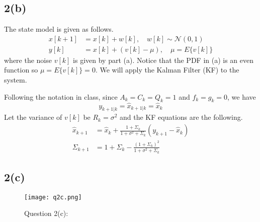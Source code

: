 \documentclass[a4paper, 11pt]{article}
\begin{document}
\subsection*{2(b)}

The state model is given as follows. 
\begin{equation}
\begin{split}
x[k+1] & = x[k] + w[k], \quad w[k]\sim\mathcal{N}(0,1)\\
y[k] & = x[k] + \left(v[k] - \mu \right), \quad \mu = E\{v[k]\}
\end{split}
\end{equation}
where the noise $v[k]$ is given by part (a). Notice that the PDF in (a) is an even function so $\mu =  E\{v[k]\} = 0$. We will apply the Kalman Filter (KF) to the system. 

Following the notation in class, since $A_k = C_k = Q_k = 1$ and $f_k = g_k = 0$, we have 
\begin{equation}
y_{k+1|k} = \hat{x}_{k+1|k} = \hat{x}_k
\end{equation}
Let the variance of $v[k]$ be $R_{k}=\sigma^2$ and the KF equations are the following. 
\begin{equation}
\begin{split}
\hat{x}_{k+1} & = \hat{x}_k + \frac{1 + \Sigma_k}{1 + \sigma^2 + \Sigma_k}\left( y_{k+1} - \hat{x}_k \right) \\
\Sigma_{k+1} & = 1 + \Sigma_k - \frac{(1 + \Sigma_k)^2}{1 + \sigma^2 + \Sigma_k}
\end{split}
\end{equation}


\subsection*{2(c)}

\begin{figure}
	\begin{center}
		\texttt{[image: q2c.png]}
		\caption{Question 2(c): }
	\end{center}
\end{figure}
\end{document}
